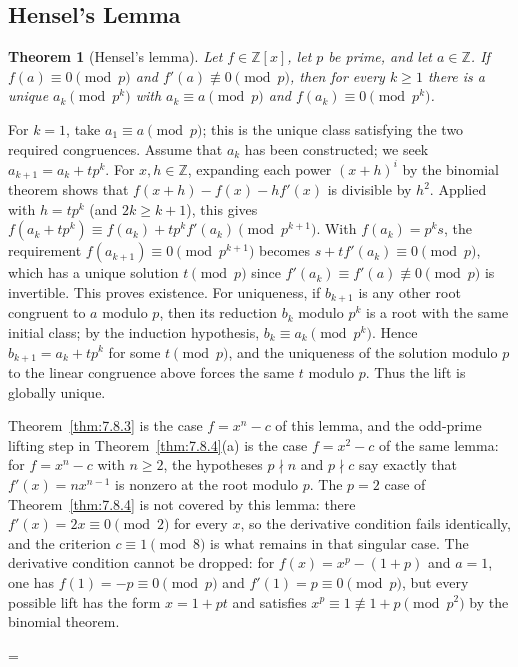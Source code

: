 \documentclass[11pt]{article}
\makeatletter
\theoremstyle{ntstyle}
\newtheorem{theorem}{Theorem}[subsection]
\let\nt@closedisplay\]
\def\nt@guardedclose{\@ifnextchar\par{\nt@closeafterpar}{\@ifnextchar\end{\postdisplaypenalty\@M\nt@closedisplay}{\nt@closedisplay}}}
\def\nt@closeafterpar\par{\@ifnextchar\par{\nt@closeafterpar}{\@ifnextchar\end{\postdisplaypenalty\@M\nt@closedisplay\par}{\nt@closedisplay\par}}}
\renewenvironment{proof}[1][\proofname]{\par
  \pushQED{\qed}\normalfont\topsep\medskipamount\edef\nt@afterproof{\@endparpenalty=\the\@endparpenalty\relax}\@beginparpenalty\@M\@endparpenalty\@M\let\]\nt@guardedclose\trivlist\item[]\textit{#1\@addpunct{.}} \ignorespaces}{\ifvmode\addpenalty\@M\fi\popQED\nt@afterproof\endtrivlist\@endpefalse}
\makeatother
\begin{document}
\subsection{Hensel's Lemma}

\begin{theorem}[Hensel's lemma]\label{thm:11.4.1} Let
	$f\in\mathbb{Z}[x]$, let $p$ be prime, and let $a\in\mathbb{Z}$. If
	$f(a)\equiv0\pmod{p}$ and
	$f'(a)\not\equiv0\pmod{p}$, then for every $k\ge1$ there is a unique
	$a_k\pmod{p^k}$ with $a_k\equiv a\pmod{p}$ and $f(a_k)\equiv0\pmod{p^k}$.

\end{theorem}

\begin{proof} For $k=1$, take $a_1\equiv a\pmod p$; this is the unique
	class satisfying the two required congruences. Assume that $a_k$ has
	been constructed; we seek $a_{k+1}=a_k+tp^k$.
	For $x,h\in\mathbb{Z}$, expanding each power $(x+h)^i$ by the
	binomial theorem shows that
	$f(x+h)-f(x)-hf'(x)$ is divisible by $h^2$. Applied with
	$h=tp^k$ (and $2k\ge k+1$), this gives
	$f(a_k + tp^k)\equiv f(a_k) +
		t p^k f'(a_k)\pmod{p^{k+1}}$. With $f(a_k) = p^k s$, the
	requirement $f(a_{k+1})\equiv0\pmod{p^{k+1}}$ becomes $s + t
		f'(a_k)\equiv0\pmod{p}$, which has a unique solution $t\pmod{p}$ since
	$f'(a_k)\equiv f'(a)\not\equiv0\pmod{p}$ is invertible. This proves existence. For uniqueness, if $b_{k+1}$ is any other root congruent to $a$ modulo $p$, then its reduction $b_k$ modulo $p^k$ is a root with the same initial class; by the induction hypothesis, $b_k\equiv a_k\pmod{p^k}$. Hence $b_{k+1}=a_k+tp^k$ for some $t\pmod{p}$, and the uniqueness of the solution modulo $p$ to the linear congruence above forces the same $t$ modulo $p$. Thus the lift is globally unique.

	Theorem~\ref{thm:7.8.3} is the case $f=x^n-c$ of this lemma, and the
	odd-prime lifting step in Theorem~\ref{thm:7.8.4}(a) is the case $f=x^2-c$ of the same lemma:
	for $f=x^n-c$ with $n\ge2$, the hypotheses $p\nmid n$ and
	$p\nmid c$ say exactly that $f'(x) = n x^{n-1}$ is nonzero at the root
	modulo $p$. The $p = 2$ case of Theorem~\ref{thm:7.8.4} is not covered by this
	lemma: there $f'(x) = 2x \equiv 0 \pmod{2}$ for every $x$, so the derivative
	condition fails identically, and the criterion $c\equiv1\pmod8$ is what
	remains in that singular case. The derivative condition cannot be
	dropped: for $f(x)=x^p-(1+p)$ and $a=1$, one has
	$f(1)=-p\equiv0\pmod p$ and $f'(1)=p\equiv0\pmod p$, but every possible
	lift has the form $x=1+pt$ and satisfies $x^p\equiv1\not\equiv1+p\pmod{p^2}$ by
	the binomial theorem.

\end{proof}
\end{document}
